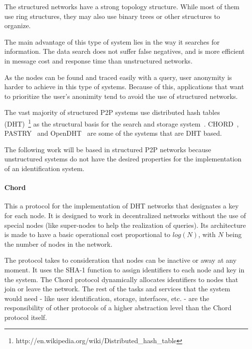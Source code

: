 The structured networks have a strong topology structure. While most of them
use ring structures, they may also use binary trees or other
structures to organize.

The main advantage of this type of system lies in the way it searches for
information. The data search does not
suffer false negatives, and is more efficient in message cost and response
time than unstructured networks. 

As the nodes can be found and traced easily with a query, user anonymity is harder to
achieve in this type of systems. Because of this, applications that want to
prioritize the user's anonimity tend to avoid the use of structured networks.

The vast majority of structured P2P systems use distributed hash tables
(DHT)~\footnote{http://en.wikipedia.org/wiki/Distributed\_hash\_table} as
the structural basis for the search and storage system~\cite{BalakrishnanEtAl03}.
CHORD~\cite{conf:hotos:DabekBKKMSB01},
PASTRY~\cite{oai:CiteSeerPSU:441779} and 
OpenDHT~\cite{Rhea:2005:OPD:1080091.1080102}
are some of the systems that are DHT based.

The following work will be based in structured P2P networks because unstructured
systems do not have the desired properties for the implementation of an
identification system. 

\paragraph{Chord}
\label{sec:chord}

This a protocol for the implementation of DHT networks that designates a key
for each node. It is designed to work in decentralized networks without the use of
special nodes (like super-nodes to help the realization of queries). Its 
architecture is made to have a basic operational cost proportional to $log(N)$,
with $N$ being the number of nodes in the network.

The protocol takes to consideration that nodes can be inactive or away at any
moment. It uses the SHA-1 function to assign identifiers to each node
and key in the system. The Chord protocol dynamically allocates identifiers to nodes that
join or leave the network. The rest of the tasks and services that the system
would need - like user identification, storage, interfaces, etc. - are the
responsibility of other protocols of a higher abstraction level than the
Chord protocol itself.

